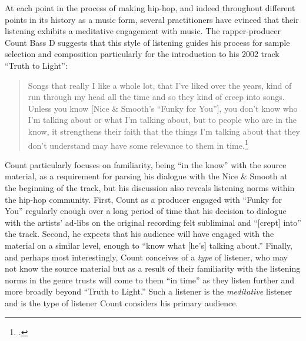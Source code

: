 At each point in the process of making hip-hop, and indeed throughout different points in
its history as a music form, several practitioners have evinced that their listening exhibits
a meditative engagement with music. The rapper-producer Count Bass D suggests that this style
of listening guides his process for sample selection and composition particularly for the
introduction to his 2002 track ``Truth to Light'': 
    \begin{quote}
        Songs that really I like a whole lot, that I've liked over the years, kind of run through my head all
        the time and so they kind of creep into songs. \textellipsis Unless you know [Nice \& Smooth's ``Funky
        for You''], you don't know who I'm talking about or what I'm talking about, but to people who are in
        the know, it strengthens their faith that the things I'm talking about that they don't understand may
        have some relevance to them in time.\footnote{\autocite[100]{mickeyhessHipHopDead2007}.}
    \end{quote}
Count particularly focuses on familiarity, being ``in the know'' with the source material, as
a requirement for parsing his dialogue with the Nice \& Smooth at the beginning of the track, but
his discussion also reveals listening norms within the hip-hop community. First, Count as a producer
engaged with ``Funky for You'' regularly enough over a long period of time that his decision to
dialogue with the artists' ad-libs on the original recording felt subliminal and ``[crept] into''
the track. Second, he expects that his audience will have engaged with the material on a similar
level, enough to ``know what [he's] talking about.'' Finally, and perhaps most interestingly,
Count conceives of a \emph{type} of listener, who may not know the source material but as a
result of their familiarity with the listening norms in the genre trusts will come to them
``in time'' as they listen further and more broadly beyond ``Truth to Light.'' Such a
listener is the \emph{meditative} listener and is the type of listener Count considers
his primary audience.

